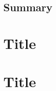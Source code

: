 \documentclass[a4paper,12pt]{report}
\begin{document}
\section{Summary}


\chapter{Title}

\chapter{Title}


\appendix
\singlespacing

 
 
\end{document}
